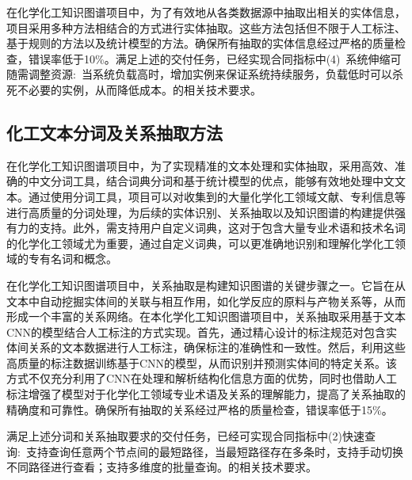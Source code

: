 在化学化工知识图谱项目中，为了有效地从各类数据源中抽取出相关的实体信息，项目采用多种方法相结合的方式进行实体抽取。这些方法包括但不限于人工标注、基于规则的方法以及统计模型的方法。确保所有抽取的实体信息经过严格的质量检查，错误率低于10\%。满足上述的交付任务，已经实现合同指标中{\heiti (4)~系统伸缩可随需调整资源:~当系统负载高时，增加实例来保证系统持续服务，负载低时可以杀死不必要的实例，从而降低成本。}的相关技术要求。

\subsection{\hwfs 化工文本分词及关系抽取方法} 
在化学化工知识图谱项目中，为了实现精准的文本处理和实体抽取，采用高效、准确的中文分词工具，结合词典分词和基于统计模型的优点，能够有效地处理中文文本。通过使用分词工具，项目可以对收集到的大量化学化工领域文献、专利信息等进行高质量的分词处理，为后续的实体识别、关系抽取以及知识图谱的构建提供强有力的支持。此外，需支持用户自定义词典，这对于包含大量专业术语和技术名词的化学化工领域尤为重要，通过自定义词典，可以更准确地识别和理解化学化工领域的专有名词和概念。

在化学化工知识图谱项目中，关系抽取是构建知识图谱的关键步骤之一。它旨在从文本中自动挖掘实体间的关联与相互作用，如化学反应的原料与产物关系等，从而形成一个丰富的关系网络。在本化学化工知识图谱项目中，关系抽取采用基于文本\textrm{CNN}的模型结合人工标注的方式实现。首先，通过精心设计的标注规范对包含实体间关系的文本数据进行人工标注，确保标注的准确性和一致性。然后，利用这些高质量的标注数据训练基于\textrm{CNN}的模型，从而识别并预测实体间的特定关系。该方式不仅充分利用了\textrm{CNN}在处理和解析结构化信息方面的优势，同时也借助人工标注增强了模型对于化学化工领域专业术语及关系的理解能力，提高了关系抽取的精确度和可靠性。确保所有抽取的关系经过严格的质量检查，错误率低于15\%。

满足上述分词和关系抽取要求的交付任务，已经可实现合同指标中{\heiti (2)快速查询:~支持查询任意两个节点间的最短路径，当最短路径存在多条时，支持手动切换不同路径进行查看；支持多维度的批量查询。}的相关技术要求。


